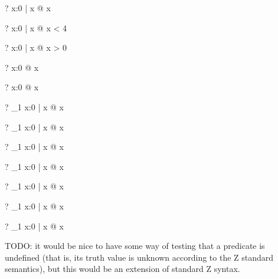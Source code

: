 \documentclass{article}
\begin{document}
\begin{zed} \vdash? \exists x:0  | x  @ x   \end{zed}
\begin{zed} \vdash? \exists x:0  | x  @ x < 4 \end{zed}
\begin{zed} \vdash? \exists x:0  | x  @ x > 0 \end{zed}
\begin{zed} \vdash? \exists x:0  @ x  \end{zed}
\begin{zed} \vdash? \lnot \exists x:0  @ \lnot x   \end{zed}

\begin{zed} \vdash? \lnot \exists_1 x:0  | x  @ x   \end{zed}
\begin{zed} \vdash? \exists_1 x:0  | x  @ x  \end{zed}
\begin{zed} \vdash? \exists_1 x:0  | x  @ x  \end{zed}
\begin{zed} \vdash? \exists_1 x:0  | x  @ x  \end{zed}
\begin{zed} \vdash? \exists_1 x:0  | x  @ x  \end{zed}
\begin{zed} \vdash? \lnot \exists_1 x:0  | x  @ x  \end{zed}
\begin{zed} \vdash? \lnot \exists_1 x:0  | x  @ \lnot x  \end{zed}

TODO: it would be nice to have some way of testing that a predicate is 
      undefined (that is, its truth value is unknown according to the Z 
      standard semantics), but this would be an extension of standard Z syntax.
\end{document}
